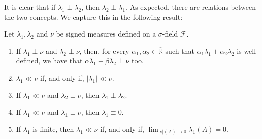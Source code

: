 It is clear that if \(\lambda_{1}\perp\lambda_{2}\), then \(\lambda_{2}\perp\lambda_{1}\). As
expected, there are relations between the two concepts. We capture this in the following result:
\begin{lemm}\label{lemma:properties of singularity and absolute continuity}
  Let \(\lambda_{1}, \lambda_{2}\) and \(\nu\) be signed measures defined on a \(\sigma\)-field \(\mathcal{F}\).
  \begin{enumerate}
	\item\label{lemma:properties of singularity and absolute continuity 1} If \(\lambda_{1}\perp\nu\) and \(\lambda_{2}\perp\nu\), then, for every \(\alpha_{1}, \alpha_{2}\in \overline{\mathbb{R}}\) such that \(\alpha_{1}\lambda_{1}+\alpha_{2}\lambda_{2}\) is well-defined, we have that \(\alpha\lambda_{1}+\beta\lambda_{2}\perp\nu\) too.
	\item\label{lemma:properties of singularity and absolute continuity 2} \(\lambda_{1}\ll\nu\) if, and only if, \(|\lambda_{1}|\ll\nu\).
	\item\label{lemma:properties of singularity and absolute continuity 3} If \(\lambda_{1}\ll\nu\) and \(\lambda_{2}\perp\nu\), then \(\lambda_{1}\perp\lambda_{2}\).
	\item\label{lemma:properties of singularity and absolute continuity 4} If \(\lambda_{1}\ll\nu\) and \(\lambda_{1}\perp\nu\), then \(\lambda_{1}\equiv 0\).
	\item\label{lemma:properties of singularity and absolute continuity 5} If \(\lambda_{1}\) is finite, then \(\lambda_{1}\ll\nu\) if, and only if, \(\lim_{|\nu|(A)\to0}\lambda_{1}(A)=0\).
  \end{enumerate}
\end{lemm}

